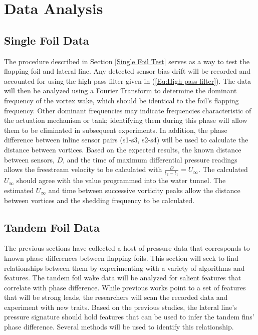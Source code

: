 \section{Data Analysis} \label{Data Analysis}
\subsection{Single Foil Data} \label{Single Foil Data}

    The procedure described in Section \ref{Single Foil Test} serves as a way to test the flapping foil and lateral line. Any detected sensor bias drift will be recorded and accounted for using the high pass filter given in (\ref{Eq:High pass filter}). The data will then be analyzed using a Fourier Transform to determine the dominant frequency of the vortex wake, which should be identical to the foil's flapping frequency. Other dominant frequencies may indicate frequencies characteristic of the actuation mechanism or tank; identifying them during this phase will allow them to be eliminated in subsequent experiments. In addition, the phase difference between inline sensor pairs (s1-s3, s2-s4) will be used to calculate the distance between vortices. Based on the expected results, the known distance between sensors, \(D\), and the time of maximum differential pressure readings allows the freestream velocity to be calculated with \(\frac{D}{t_2-t_1}=U_\infty\). The calculated \(U_\infty\) should agree with the value programmed into the water tunnel. The estimated \(U_\infty\) and time between successive vorticity peaks allow the distance between vortices and the shedding frequency to be calculated.
    
\subsection{Tandem Foil Data} \label{Tandem Foil Data}

    The previous sections have collected a host of pressure data that corresponds to known phase differences between flapping foils. This section will seek to find relationships between them by experimenting with a variety of algorithms and features. The tandem foil wake data will be analyzed for salient features that correlate with phase difference. While previous works point to a set of features that will be strong leads, the researchers will scan the recorded data and experiment with new traits. Based on the previous studies, the lateral line's pressure signature should hold features that can be used to infer the tandem fins' phase difference. Several methods will be used to identify this relationship.
    
